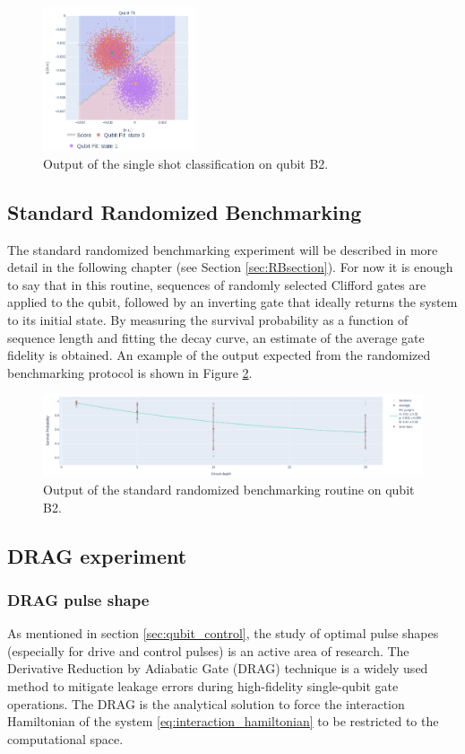 \begin{figure}[h!]
    \centering
    \includegraphics[width=0.4\textwidth]{figures/png/classification.png}
    \caption{Output of the single shot classification on qubit B2.}
    \label{fig:classification}
\end{figure}


\subsection{Standard Randomized Benchmarking}\label{sec:RB_calibration}
The standard randomized benchmarking experiment will be described in more detail in the following chapter (see Section \ref{sec:RBsection}).
For now it is enough to say that in this routine, sequences of randomly selected Clifford gates are applied to the qubit, followed by an inverting gate that ideally returns the system to its initial state. 
By measuring the survival probability as a function of sequence length and fitting the decay curve, an estimate of the average gate fidelity is obtained.
An example of the output expected from the randomized benchmarking protocol is shown in Figure \ref{fig:rb}.

\begin{figure}[h!]
    \centering
    \includegraphics[width=\textwidth]{figures/png/rb.png}
    \caption{Output of the standard randomized benchmarking routine on qubit B2.}
    \label{fig:rb}
\end{figure}


\subsection{DRAG experiment}\label{sec:DRAG}
\subsubsection{DRAG pulse shape}
As mentioned in section \ref{sec:qubit_control}, the study of optimal pulse shapes (especially for drive and control pulses) is an active area of research. 
The Derivative Reduction by Adiabatic Gate (DRAG) technique \cite{Motzoi_2009}\cite{Gambetta_2011} is a widely used method to mitigate leakage errors during high-fidelity single-qubit gate operations.
The DRAG is the analytical solution to force the interaction Hamiltonian of the system \ref{eq:interaction_hamiltonian} to be restricted to the computational space.

